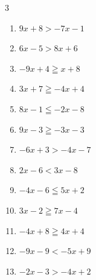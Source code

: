 \begin{multicols}{3}
\begin{enumerate}
        \phantom{$\displaystyle x<2$}

  \item $9x+8>-7x-1$


  \item $6x-5>8x+6$


  \item $-9x+4\geqq x+8$


  \item $3x+7\geqq -4x+4$


\columnbreak %

  \item $8x-1\leqq -2x-8$


  \item $9x-3\geqq -3x-3$

        \phantom{$\displaystyle x\geqq 0$}

  \item $-6x+3>-4x-7$

        \phantom{$\displaystyle x<5$}

  \item $2x-6<3x-8$

        \phantom{$\displaystyle x>2$}

  \item $-4x-6\leqq 5x+2$


  \item $3x-2\geqq 7x-4$


  \item $-4x+8\geqq 4x+4$


  \item $-9x-9<-5x+9$


  \item $-2x-3>-4x+2$



\end{enumerate}
\end{multicols}

